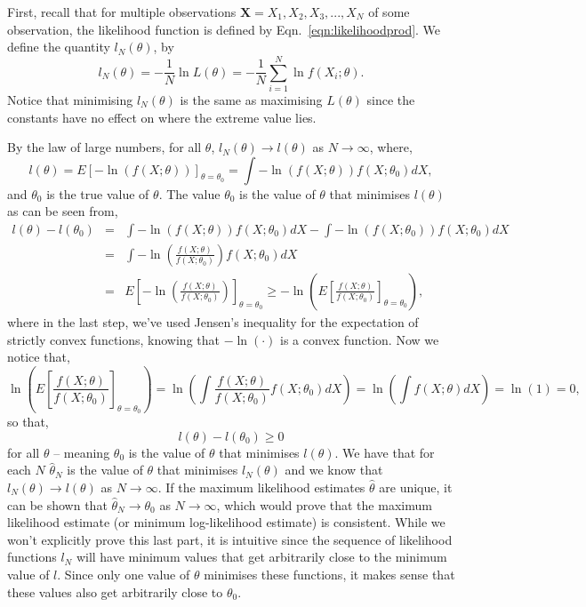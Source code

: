 First, recall that for multiple observations $\mathbf{X}=X_1,X_2,X_3,...,X_{N}$ of some observation, the likelihood function is defined by Eqn.~\ref{eqn:likelihoodprod}. We define the quantity $l_{N}(\theta)$, by 
\begin{equation}\label{eqn:defln}
    l_{N}(\theta) = -\frac{1}{N}\ln L(\theta) =  -\frac{1}{N}\sum_{i=1}^{N}\ln f(X_{i};\theta).
\end{equation}
Notice that minimising $l_{N}(\theta)$ is the same as maximising $L(\theta)$ since the constants have no effect on where the extreme value lies. 

By the law of large numbers, for all $\theta$, $l_{N}(\theta)\rightarrow l(\theta)$ as $N\rightarrow\infty$, where, 
\begin{equation}
    l(\theta) = E\left[-\ln(f(X;\theta))\right]_{\theta=\theta_{0}} = \int -\ln(f(X;\theta))f(X;\theta_{0})dX,
\end{equation}
and $\theta_{0}$ is the true value of $\theta$. 
The value $\theta_{0}$ is the value of $\theta$ that minimises $l(\theta)$ as can be seen from, 
\begin{eqnarray}
    l(\theta)-l(\theta_{0}) &=& \int -\ln(f(X;\theta))f(X;\theta_{0})dX- \int -\ln(f(X;\theta_{0}))f(X;\theta_{0})dX \\
     & = & \int -\ln\left(\frac{f(X;\theta)}{f(X;\theta_0)}\right)f(X;\theta_{0})dX\\
     & = & E\left[-\ln\left(\frac{f(X;\theta)}{f(X;\theta_0)}\right)\right]_{\theta=\theta_{0}} 
      \geq  -\ln\left( E \left[\frac{f(X;\theta)}{f(X;\theta_0)}\right]_{\theta=\theta_{0}}\right),
\end{eqnarray}
where in the last step, we've used Jensen’s inequality for the expectation of strictly convex functions, knowing that $-\ln(\cdot)$ is a convex function. Now we notice that, 
\begin{equation}
    \ln\left( E \left[\frac{f(X;\theta)}{f(X;\theta_0)}\right]_{\theta=\theta_{0}}\right) = \ln\left(\int \frac{f(X;\theta)}{f(X;\theta_0)}f(X;\theta_{0})dX\right) = \ln\left(\int f(X;\theta)dX\right) = \ln(1) = 0,
\end{equation}
so that, 
\begin{equation}
l(\theta)-l(\theta_{0}) \geq 0
\end{equation}
for all $\theta$ -- meaning $\theta_0$ is the value of $\theta$ that minimises $l(\theta)$. We have that for each $N$ $\hat{\theta}_{N}$ is the value of $\theta$ that minimises $l_{N}(\theta)$ and we know that $l_{N}(\theta)\rightarrow l(\theta)$ as $N\rightarrow \infty$. If the maximum likelihood estimates $\hat{\theta}$ are unique, it can be shown that $\hat{\theta}_{N}\rightarrow\theta_{0}$  as $N\rightarrow \infty$, which would prove that the maximum likelihood estimate (or minimum log-likelihood estimate) is consistent. While we won't explicitly prove this last part, it is intuitive since the sequence of likelihood functions $l_{N}$ will have minimum values that get arbitrarily close to the minimum value of $l$. Since only one value of $\theta$ minimises these functions, it makes sense that these values also get arbitrarily close to $\theta_0$.  

